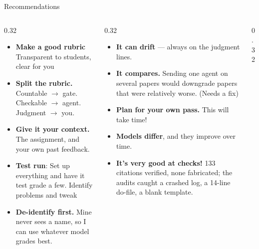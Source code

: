 \documentclass[aspectratio=169, 10pt]{beamer}
\begin{document}
\begin{frame}{Recommendations}
\vskip-2pt
\begin{columns}[T]
\begin{column}{0.32\textwidth}
\begin{tcolorbox}[dobox, title={\faCheck\quad Do}, top=2pt, bottom=2pt]
\scriptsize
\begin{itemize}\setlength{\itemsep}{3pt}
\item \textbf{Make a good rubric} Transparent to students, clear for you
  \item \textbf{Split the rubric.} Countable $\rightarrow$ gate. Checkable $\rightarrow$ agent. Judgment $\rightarrow$ you.
  \item \textbf{Give it your context.} The assignment, and your own past feedback.
  \item \textbf{Test run}: Set up everything and have it test grade a few. Identify problems and tweak
  \item \textbf{De-identify first.} Mine never sees a name, so I can use whatever model grades best.
\end{itemize}
\end{tcolorbox}
\end{column}
\begin{column}{0.32\textwidth}
\begin{tcolorbox}[dontbox, title={\faExclamationTriangle\quad Expect}, top=2pt, bottom=2pt]
\scriptsize
\begin{itemize}\setlength{\itemsep}{3pt}
  \item \textbf{It can drift} --- always on the judgment lines. 
  \item \textbf{It compares.} Sending one agent on several papers would downgrade papers that were relatively worse. (Needs a fix)
  \item \textbf{Plan for your own pass.} This will take time!
  \item \textbf{Models differ}, and they improve over time. 
  \item \textbf{It's very good at checks!} 133 citations verified, none fabricated; the audits caught a crashed log, a 14-line do-file, a blank template.
\end{itemize}
\end{tcolorbox}
\end{column}
\begin{column}{0.32\textwidth}
\begin{tcolorbox}[keybox, title={\faBalanceScale\quad When it's worth it}, top=2pt, bottom=2pt]

\end{tcolorbox}
\end{column}
\end{columns}
\end{frame}
\end{document}
